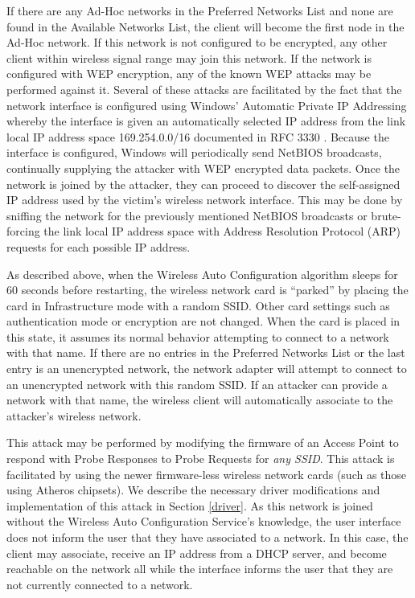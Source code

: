 \documentclass[10pt,twocolumn]{article}
\begin{document}

If there are any Ad-Hoc networks in the Preferred Networks List and
none are found in the Available Networks List, the client will become
the first node in the Ad-Hoc network.  If this network is not
configured to be encrypted, any other client within wireless signal
range may join this network.  If the network is configured with WEP
encryption, any of the known WEP attacks may be performed against it.
Several of these attacks are facilitated by the fact that the network
interface is configured using Windows' Automatic Private IP Addressing
whereby the interface is given an automatically selected IP address
from the link local IP address space 169.254.0.0/16 documented in RFC
3330 \cite{rfc3330}.  Because the interface is configured, Windows
will periodically send NetBIOS broadcasts, continually supplying the
attacker with WEP encrypted data packets.  Once the network is joined
by the attacker, they can proceed to discover the self-assigned IP
address used by the victim's wireless network interface.  This may be
done by sniffing the network for the previously mentioned NetBIOS
broadcasts or brute-forcing the link local IP address space with
Address Resolution Protocol (ARP) requests for each possible IP
address.


As described above, when the Wireless Auto Configuration algorithm
sleeps for 60 seconds before restarting, the wireless network card is
``parked'' by placing the card in Infrastructure mode with a random
SSID.  Other card settings such as authentication mode or encryption
are not changed.  When the card is placed in this state, it assumes
its normal behavior attempting to connect to a network with that name.
If there are no entries in the Preferred Networks List or the last
entry is an unencrypted network, the network adapter will attempt to
connect to an unencrypted network with this random SSID.  If an
attacker can provide a network with that name, the wireless client
will automatically associate to the attacker's wireless network.

This attack may be performed by modifying the firmware of an Access
Point to respond with Probe Responses to Probe Requests for {\it any
SSID}.  This attack is facilitated by using the newer firmware-less
wireless network cards (such as those using Atheros chipsets).  We
describe the necessary driver modifications and implementation of this
attack in Section \ref{driver}.  As this network is joined without the
Wireless Auto Configuration Service's knowledge, the user interface
does not inform the user that they have associated to a network.  In
this case, the client may associate, receive an IP address from a DHCP
server, and become reachable on the network all while the interface
informs the user that they are not currently connected to a network.
\end{document}
